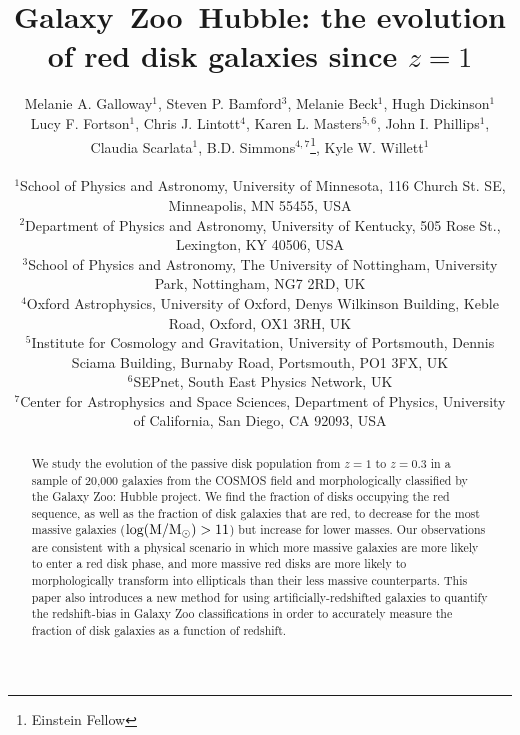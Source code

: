 \documentclass[useAMS,usenatbib]{mn2e}
\begin{document}
\title[Galaxy~Zoo~Hubble: passive red disks]{Galaxy~Zoo~Hubble: the evolution of red disk galaxies since $z=1$}
\author[Galloway et~al.]{\parbox[t]{16cm}{Melanie A. Galloway$^{1}$, Steven P. Bamford$^{3}$, Melanie Beck$^{1}$,
Hugh Dickinson$^{1}$ Lucy F. Fortson$^{1}$, Chris J. Lintott$^{4}$, Karen L. Masters$^{5,6}$, John I. Phillips$^{1}$, Claudia Scarlata$^{1}$,
B.D. Simmons$^{4,7}$\footnote{Einstein Fellow}, Kyle W. Willett$^{1}$
\vspace{0.1in} }\\
$^{1}$School of Physics and Astronomy, University of Minnesota, 116 Church St. SE, Minneapolis, MN 55455, USA \\
$^{2}$Department of Physics and Astronomy, University of Kentucky, 505 Rose St., Lexington, KY 40506, USA \\
$^{3}$School of Physics and Astronomy, The University of Nottingham, University Park, Nottingham, NG7 2RD, UK \\
$^{4}$Oxford Astrophysics, University of Oxford, Denys Wilkinson Building, Keble Road, Oxford, OX1 3RH, UK \\
$^{5}$Institute for Cosmology and Gravitation, University of Portsmouth, Dennis Sciama Building, Burnaby Road, Portsmouth, PO1 3FX, UK \\
$^{6}$SEPnet, South East Physics Network, UK \\
$^{7}$Center for Astrophysics and Space Sciences, Department of Physics, University of California, San Diego, CA 92093, USA \\
   }
\maketitle

\begin{abstract}
We study the evolution of the passive disk population from $z=1$ to $z=0.3$ in a sample of 20,000 galaxies from the COSMOS field and morphologically classified by the Galaxy Zoo: Hubble project. We find the fraction of disks occupying the red sequence, as well as the fraction of disk galaxies that are red, to decrease for the most massive galaxies ($\rm log(M/M_{\odot})>11$) but increase for lower masses. Our observations are consistent with a physical scenario in which more massive galaxies are more likely to enter a red disk phase, and more massive red disks are more likely to morphologically transform into ellipticals than their less massive counterparts. This paper also introduces a new method for using artificially-redshifted galaxies to quantify the redshift-bias in Galaxy Zoo classifications in order to accurately measure the fraction of disk galaxies as a function of redshift.  


\end{abstract}
\end{document}

